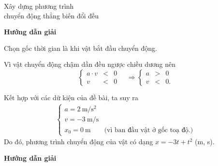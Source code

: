 \begin{dang}{Xây dựng phương trình\\ chuyển động thẳng biến đổi đều}
	{	\begin{center}
			\textbf{Hướng dẫn giải}
		\end{center}
		
		Chọn gốc thời gian là khi vật bắt đầu chuyển động.
		
		Vì vật chuyển động chậm dần đều ngược chiều dương nên
		\begin{equation*}
			\left\{
			\begin{array}{rcl}
				a\cdot v &<&0\\
				v &<& 0
			\end{array}
			\right.
			\quad
			\Rightarrow 
			\left\{
			\begin{array}{rcl}
				a &>& 0\\
				v &<& 0.
			\end{array}
			\right.
		\end{equation*}
		
		Kết hợp với các dữ kiện của đề bài, ta suy ra
			\begin{align*}
				\begin{cases}
					a=\SI{2}{\meter/\second^2}\\
					v=\SI{-3}{\meter/\second}\\
					x_0=\SI{0}{\meter} \qquad\text{(vì ban đầu vật ở gốc toạ độ.)}
				\end{cases}
			\end{align*}
		Do đó, phương trình chuyển động của vật có dạng
		$x=-3t+t^2$ (m, s).
	}
	{	\begin{center}
			\textbf{Hướng dẫn giải}
		\end{center}
		
}
\end{dang}
